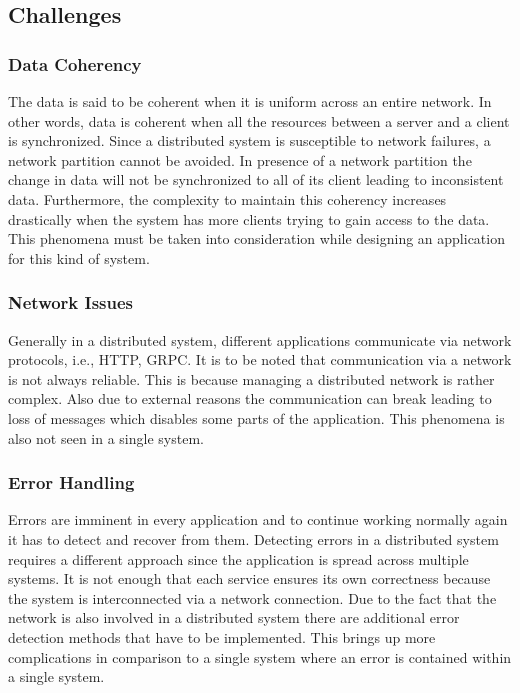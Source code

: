     \subsection{Challenges}    
        \label{subsection: distriChallenges}
        \subsubsection{Data Coherency}
        The data is said to be coherent when it is uniform across an entire network. In other words, data is coherent when all
        the resources between a server and a client is synchronized. 
        Since a distributed system is susceptible to network failures, a network partition \cite[p.~59]{CAP} cannot be avoided. In presence
        of a network partition the change in data will not be synchronized to all of its client leading to inconsistent data. Furthermore, the
        complexity to maintain this coherency increases drastically when the system has more clients trying to gain access to the data. This phenomena
        must be taken into consideration while designing an application for this kind of system.

        \subsubsection{Network Issues}
        Generally in a distributed system, different applications communicate via network protocols, i.e., HTTP, GRPC. It is to be noted that
        communication via a network is not always reliable. This is because managing a distributed network is rather complex. Also due to
        external reasons the communication can break leading to loss of messages which disables some parts of the application. 
        This phenomena is also not seen in a single system.

        \subsubsection{Error Handling}
        Errors are imminent in every application and to continue working normally again it has to detect and recover from them.
        Detecting errors in a distributed system requires a different approach since the application is spread across multiple systems. 
        It is not enough that each service ensures its own correctness because the system is interconnected via a
        network connection. Due to the fact that the network is also involved in a distributed system there are additional error detection methods that have
        to be implemented. This brings up more complications in comparison to a single system where an error is contained within a single system.

         

